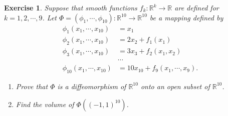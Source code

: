 \documentclass[11pt]{article}
\newtheorem{exercise}{Exercise}[section]
\theoremstyle{definition}
\numberwithin{equation}{subsection}
\begin{document}
\begin{exercise}{\rm *}
Suppose that smooth functions $f_k: \mathbb{R}^k \to \mathbb{R}$ are defined for $k = 1, 2, \cdots, 9$. Let $\Phi = (\phi_1, \cdots, \phi_{10}): \mathbb{R}^{10} \to \mathbb{R}^{10}$ be a mapping defined by
\begin{align*}
    \phi_1(x_1, \cdots, x_{10}) & = x_1 \\
    \phi_2(x_1, \cdots, x_{10}) & = 2x_2 + f_1(x_1) \\
    \phi_3(x_1, \cdots, x_{10}) & = 3x_3 + f_2(x_1, x_2) \\
    & \cdots \\
    \phi_{10}(x_1, \cdots, x_{10}) & = 10x_{10} + f_9(x_1, \cdots, x_9).
\end{align*}
\begin{enumerate}[label=(\alph*)]
    \item Prove that $\Phi$ is a diffeomorphism of $\mathbb{R}^{10}$ onto an open subset of $\mathbb{R}^{10}$.
    
    \item Find the volume of $\Phi((-1,1)^{10})$.
\end{enumerate}
\end{exercise}
\end{document}
